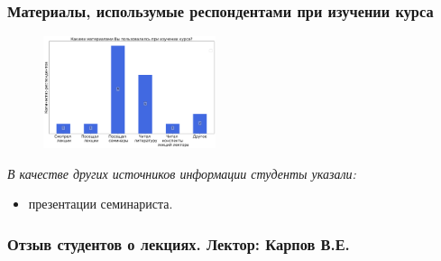 	\subsubsection{Материалы, использумые респондентами при изучении курса}

		\begin{figure}[H]
			\centering
			\includegraphics[width = 0.45\textwidth]{images/4 course/Введение в распараллеливание алгоритмов и программ/materials.png}
		\end{figure}

		\textit{В качестве других источников информации студенты указали:} 
		\begin{itemize}
			\item презентации семинариста.
		\end{itemize}

	\subsubsection{Отзыв студентов о лекциях. Лектор: Карпов В.Е.}

